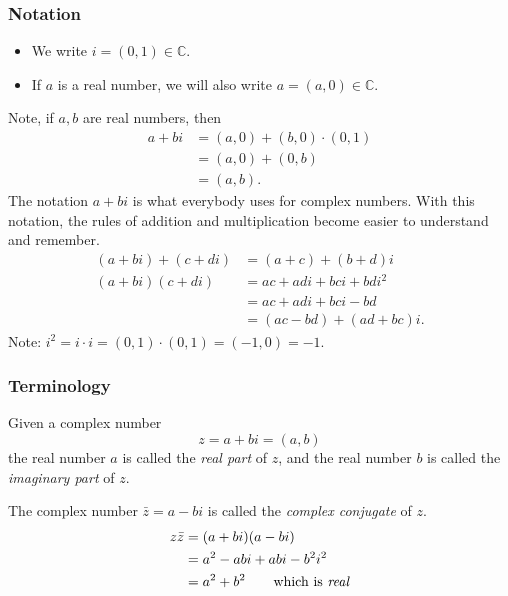 \documentclass[11pt]{article}
\begin{document}
    \subsubsection{Notation}
    \begin{itemize}
        \item We write \(i = (0,1) \in \mathbb{C}.\)
        \item If $a$ is a real number, we will also write \(a = (a,0) \in \mathbb{C}\).
    \end{itemize}
    Note, if \(a,b\) are real numbers, then
    \begin{align*}
        a + bi &= (a,0) + (b,0) \cdot (0,1) \\
               &= (a,0) + (0,b)             \\
               &= (a,b).
    \end{align*}
    The notation \(a + bi\) is what everybody uses for complex numbers. With this notation, the rules of addition and multiplication become easier to understand and remember.
    \begin{align*}
        (a+bi)+(c+di) &= (a+c) + (b+d)i         \\
        (a+bi)(c+di)  &= ac + adi + bci + bdi^2 \\
                      &= ac + adi + bci - bd    \\
                      &= (ac - bd) + (ad + bc)i.
    \end{align*}
    Note: \(i^2 = i \cdot i = (0,1) \cdot (0,1) = (-1,0) = -1.\)

    \subsubsection{Terminology}
    Given a complex number \[z = a + bi = (a,b)\] the real number $a$ is called the \emph{real part} of $z$, and the real number $b$ is called the \emph{imaginary part} of $z$.

    \vspace{1em}

    The complex number \(\bar{z} = a - bi\) is called the \emph{complex conjugate} of $z$.
    \begin{align*}
        z \bar{z} &= (a+bi)(a - bi)                              \\
                  &= a^2 - abi + abi - b^2 i^2                   \\
                  &= a^2 + b^2 \qquad \text{which is \emph{real}}
    \end{align*}
\end{document}
